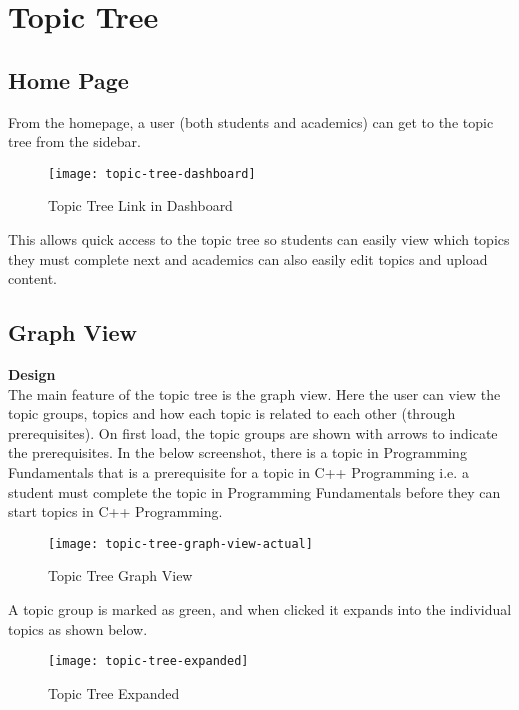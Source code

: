 \section{Topic Tree}

\subsection{Home Page}

From the homepage, a user (both students and academics) can get to the topic tree from the sidebar.\\

\begin{figure}[h!]
    \centering
    \texttt{[image: topic-tree-dashboard]}
    \caption{Topic Tree Link in Dashboard}
\end{figure}

This allows quick access to the topic tree so students can easily view which topics they must complete next and academics can also easily edit topics and upload content.\\

\subsection{Graph View}

\textbf{Design} \\

The main feature of the topic tree is the graph view. Here the user can view the topic groups, topics and how each topic is related to each other (through prerequisites). On first load, the topic groups are shown with arrows to indicate the prerequisites. In the below screenshot, there is a topic in Programming Fundamentals that is a prerequisite for a topic in C++ Programming i.e. a student must complete the topic in Programming Fundamentals before they can start topics in C++ Programming.\\

\begin{figure}[h!]
    \centering
    \texttt{[image: topic-tree-graph-view-actual]}
    \caption{Topic Tree Graph View}
\end{figure}

A topic group is marked as green, and when clicked it expands into the individual topics as shown below. \\

\begin{figure}[h!]
    \centering
    \texttt{[image: topic-tree-expanded]}
    \caption{Topic Tree Expanded}
\end{figure}

